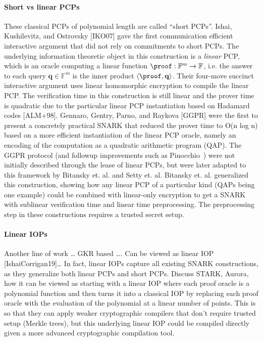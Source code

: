 \paragraph{Short vs linear PCPs} These classical PCPs of polynomial length are called ``short PCPs''. Ishai, Kushilevitz, and Ostrovsky [IKO07] gave the first communication efficient interactive argument that did not rely on commitments to short PCPs. The underlying information theoretic object in this construction is a \emph{linear} PCP, which is an oracle computing a linear function $\proof: \mathbb{F}^m \rightarrow \mathbb{F}$, i.e. the answer to each query $\mathbf{q} \in \mathbb{F}^m$ is the inner product $\langle \proof, \mathbf{q} \rangle$. Their four-move succinct interactive argument uses linear homomorphic encryption to compile the linear PCP. The verification time in this construction is still linear and the prover time is quadratic due to the particular linear PCP instantiation based on Hadamard codes [ALM+98]. Gennaro, Gentry, Parno, and Raykova [GGPR] were the first to present a concretely practical SNARK that reduced the prover time to O(n log n) based on a more efficient instantiation of the linear PCP oracle, namely an encoding of the computation as a quadratic arithmetic program (QAP). The GGPR protocol (and followup improvements such as Pinocchio~\cite{Pinocchio}) were not initially described through the lease of linear PCPs, but were later adapted to this framework by Bitansky et. al. and Setty et. al. Bitansky et. al. generalized this construction, showing how any linear PCP of a particular kind (QAPs being one example) could be combined with linear-only encryption to get a SNARK with sublinear verification time and linear time preprocessing. The preprocessing step in these constructions requires a trusted secret setup. 

\paragraph{Linear IOPs} Another line of work … GKR based …. Can be viewed as linear IOP [IshaiCorrigan19]… In fact, linear IOPs capture all existing SNARK constructions, as they generalize both linear PCPs and short PCPs. Discuss STARK, Aurora, how it can be viewed as starting with a linear IOP where each proof oracle is a polynomial function and then turns it into a classical IOP by replacing each proof oracle with the evaluation of the polynomial at a linear number of points. This is so that they can apply weaker cryptographic compilers that don't require trusted setup (Merkle trees), but this underlying linear IOP could be compiled directly given a more advanced cryptographic compilation tool. 

